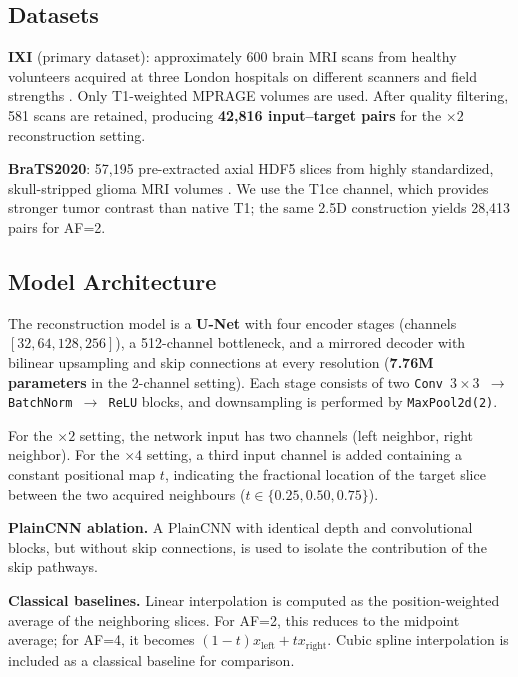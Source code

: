 \documentclass{article}
\begin{document}
\subsection{Datasets}
\textbf{IXI} (primary dataset): approximately 600 brain MRI scans from healthy volunteers acquired at three London hospitals on different scanners and field strengths \cite{ixi}. Only T1-weighted MPRAGE volumes are used. After quality filtering, 581 scans are retained, producing \textbf{42,816 input--target pairs} for the \( \times 2 \) reconstruction setting. 

\textbf{BraTS2020}: 57,195 pre-extracted axial HDF5 slices from highly
standardized, skull-stripped glioma MRI volumes \cite{bakas2017brats}. We use
the T1ce channel, which provides stronger tumor contrast than native T1; the
same 2.5D construction yields 28,413 pairs for AF=2.

\subsection{Model Architecture}
The reconstruction model is a \textbf{U-Net} \cite{ronneberger2015unet} with four encoder stages (channels \([32,64,128,256]\)), a 512-channel bottleneck, and a mirrored decoder with bilinear upsampling and skip connections at every resolution (\textbf{7.76M parameters} in the 2-channel setting). Each stage consists of two \texttt{Conv \(3\times3\) \(\to\) BatchNorm \(\to\) ReLU} blocks, and downsampling is performed by \texttt{MaxPool2d(2)}.

For the \( \times 2 \) setting, the network input has two channels (left neighbor, right neighbor). For the \( \times 4 \) setting, a third input channel is added containing a constant positional map \(t\), indicating the fractional location of the target slice between the two acquired neighbours (\(t \in \{0.25, 0.50, 0.75\}\)).

\textbf{PlainCNN ablation.} A PlainCNN with identical depth and convolutional blocks, but without skip connections, is used to isolate the contribution of the skip pathways.

\textbf{Classical baselines.} Linear interpolation is computed as the position-weighted average of the neighboring slices. For AF=2, this reduces to the midpoint average; for AF=4, it becomes \((1-t)x_{\text{left}} + tx_{\text{right}}\). Cubic spline interpolation is included as a classical baseline for comparison.
\end{document}
